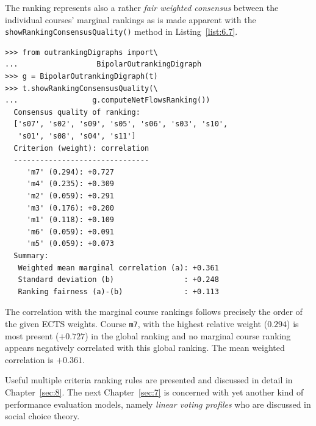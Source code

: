 The \NetFlows ranking represents also a rather \emph{fair weighted consensus} between the individual courses' marginal rankings as is made apparent with the \texttt{showRankingConsensusQuality()} method in Listing~\vref{list:6.7}.
\begin{lstlisting}[caption={Consensus quality of the students's ranking},label=list:6.7]
>>> from outrankingDigraphs import\
...                  BipolarOutrankingDigraph
>>> g = BipolarOutrankingDigraph(t)
>>> t.showRankingConsensusQuality(\
...                 g.computeNetFlowsRanking())
  Consensus quality of ranking:
  ['s07', 's02', 's09', 's05', 's06', 's03', 's10',
   's01', 's08', 's04', 's11']
  Criterion (weight): correlation
  -------------------------------
     'm7' (0.294): +0.727
     'm4' (0.235): +0.309
     'm2' (0.059): +0.291
     'm3' (0.176): +0.200
     'm1' (0.118): +0.109
     'm6' (0.059): +0.091
     'm5' (0.059): +0.073
  Summary:
   Weighted mean marginal correlation (a): +0.361
   Standard deviation (b)                : +0.248
   Ranking fairness (a)-(b)              : +0.113
\end{lstlisting}

The correlation with the marginal course rankings follows precisely the order of the given ECTS weights. Course \texttt{m7}, with the highest relative weight ($0.294$) is most present ($+0.727$) in the global \NetFlows ranking and no marginal course ranking appears negatively correlated with this global ranking. The mean weighted correlation is $+0.361$.

\vspace{1cm}
Useful multiple criteria ranking rules are presented and discussed in detail in Chapter~\ref{sec:8}. The next Chapter~\ref{sec:7} is concerned with yet another kind of performance evaluation models, namely \emph{linear voting profiles} who are discussed in social choice theory.

\clearpage


% 
